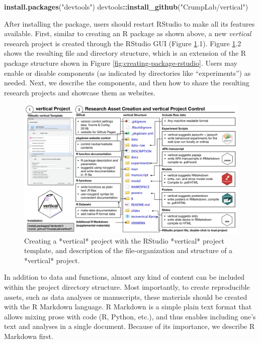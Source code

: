 \documentclass[
  english,
  jou,floatsintext]{apa6}
\newenvironment{Shaded}{\begin{snugshade}}{\end{snugshade}}
\newcommand{\KeywordTok}[1]{\textcolor[rgb]{0.13,0.29,0.53}{\textbf{#1}}}
\newcommand{\NormalTok}[1]{#1}
\newcommand{\OperatorTok}[1]{\textcolor[rgb]{0.81,0.36,0.00}{\textbf{#1}}}
\newcommand{\StringTok}[1]{\textcolor[rgb]{0.31,0.60,0.02}{#1}}
\begin{document}
\begin{Shaded}
\begin{Highlighting}[]
\KeywordTok{install.packages}\NormalTok{(}\StringTok{"devtools"}\NormalTok{)}
\NormalTok{devtools}\OperatorTok{::}\KeywordTok{install\_github}\NormalTok{(}\StringTok{"CrumpLab/vertical"}\NormalTok{)}
\end{Highlighting}
\end{Shaded}

After installing the package, users should restart RStudio to make all its features available. First, similar to creating an R package as shown above, a new \emph{vertical} research project is created through the RStudio GUI (Figure \ref{fig:vertical-project-structure}.1). Figure \ref{fig:vertical-project-structure}.2 shows the resulting file and directory structure, which is an extension of the R package structure shown in Figure \ref{fig:creating-package-rstudio}. Users may enable or disable components (as indicated by directories like ``experiments'') as needed. Next, we describe the components, and then how to share the resulting research projects and showcase them as websites.

\begin{figure}

{\centering \includegraphics[width=\textwidth]{images/vertical-project} 

}

\caption{Creating a *vertical* project with the RStudio *vertical* project template, and description of the file-organization and structure of a *vertical* project.}\label{fig:vertical-project-structure}
\end{figure}

In addition to data and functions, almost any kind of content can be included within the project directory structure. Most importantly, to create reproducible assets, such as data analyses or manuscripts, these materials should be created with the R Markdown language. R Markdown is a simple plain text format that allows mixing prose with code (R, Python, etc.), and thus enables including one's text and analyses in a single document. Because of its importance, we describe R Markdown first.
\end{document}
